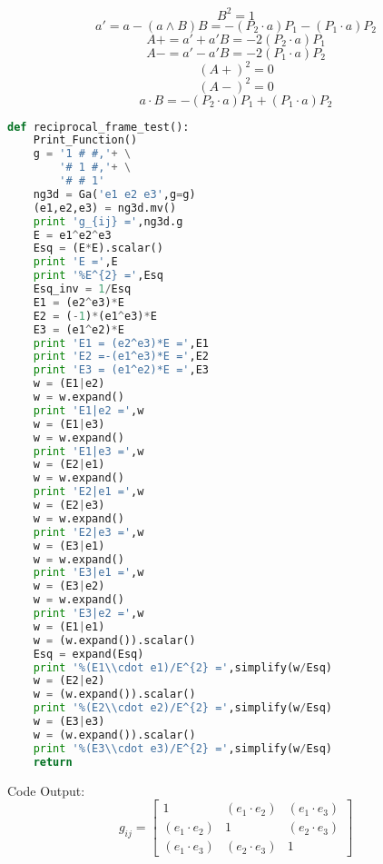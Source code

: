 \documentclass[10pt,fleqn]{report}
\newcommand{\W}{\wedge}
\begin{document}
\begin{equation*} B^{2} = 1 \end{equation*}
\begin{equation*} a' = a-(a\W B) B = - \left ( P_{2}\cdot a\right )  P_{1} - \left ( P_{1}\cdot a\right )  P_{2} \end{equation*}
\begin{equation*} A+ = a'+a' B = - 2 \left ( P_{2}\cdot a\right )  P_{1} \end{equation*}
\begin{equation*} A- = a'-a' B = - 2 \left ( P_{1}\cdot a\right )  P_{2} \end{equation*}
\begin{equation*} (A+)^{2} = 0 \end{equation*}
\begin{equation*} (A-)^{2} = 0 \end{equation*}
\begin{equation*} a\cdot B = - \left ( P_{2}\cdot a\right )  P_{1} + \left ( P_{1}\cdot a\right )  P_{2} \end{equation*}
\begin{lstlisting}[language=Python,showspaces=false,showstringspaces=false,backgroundcolor=\color{gray},frame=single]
def reciprocal_frame_test():
    Print_Function()
    g = '1 # #,'+ \
        '# 1 #,'+ \
        '# # 1'
    ng3d = Ga('e1 e2 e3',g=g)
    (e1,e2,e3) = ng3d.mv()
    print 'g_{ij} =',ng3d.g
    E = e1^e2^e3
    Esq = (E*E).scalar()
    print 'E =',E
    print '%E^{2} =',Esq
    Esq_inv = 1/Esq
    E1 = (e2^e3)*E
    E2 = (-1)*(e1^e3)*E
    E3 = (e1^e2)*E
    print 'E1 = (e2^e3)*E =',E1
    print 'E2 =-(e1^e3)*E =',E2
    print 'E3 = (e1^e2)*E =',E3
    w = (E1|e2)
    w = w.expand()
    print 'E1|e2 =',w
    w = (E1|e3)
    w = w.expand()
    print 'E1|e3 =',w
    w = (E2|e1)
    w = w.expand()
    print 'E2|e1 =',w
    w = (E2|e3)
    w = w.expand()
    print 'E2|e3 =',w
    w = (E3|e1)
    w = w.expand()
    print 'E3|e1 =',w
    w = (E3|e2)
    w = w.expand()
    print 'E3|e2 =',w
    w = (E1|e1)
    w = (w.expand()).scalar()
    Esq = expand(Esq)
    print '%(E1\\cdot e1)/E^{2} =',simplify(w/Esq)
    w = (E2|e2)
    w = (w.expand()).scalar()
    print '%(E2\\cdot e2)/E^{2} =',simplify(w/Esq)
    w = (E3|e3)
    w = (w.expand()).scalar()
    print '%(E3\\cdot e3)/E^{2} =',simplify(w/Esq)
    return
\end{lstlisting}
Code Output:
\begin{equation*} g_{ij} = \left[\begin{matrix}1 & \left ( e_{1}\cdot e_{2}\right )  & \left ( e_{1}\cdot e_{3}\right ) \\\left ( e_{1}\cdot e_{2}\right )  & 1 & \left ( e_{2}\cdot e_{3}\right ) \\\left ( e_{1}\cdot e_{3}\right )  & \left ( e_{2}\cdot e_{3}\right )  & 1\end{matrix}\right] \end{equation*}
\end{document}
